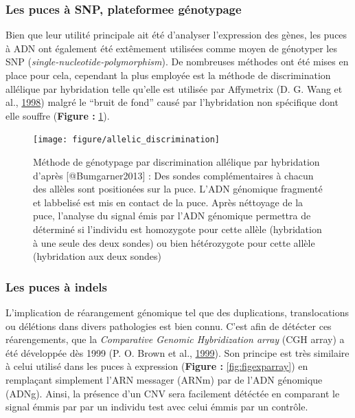 \documentclass[12pt,twoside]{reedthesis}
\theoremstyle{definition}
\theoremstyle{definition}
\theoremstyle{remark}
\begin{document}
  \newpage
  
  \subsubsection{Les puces à SNP, plateformee
  génotypage}\label{les-puces-a-snp-plateformee-genotypage}
  
  Bien que leur utilité principale ait été d'analyser l'expression des
  gènes, les puces à ADN ont également été extêmement utilisées comme
  moyen de génotyper les SNP (\emph{single-nucleotide-polymorphism}). De
  nombreuses méthodes ont été mises en place pour cela, cependant la plus
  employée est la méthode de discrimination allélique par hybridation
  telle qu'elle est utilisée par Affymetrix (D. G. Wang et al.,
  \protect\hyperlink{ref-Wang1998}{1998}) malgré le ``bruit de fond''
  causé par l'hybridation non spécifique dont elle souffre (\textbf{Figure
  :} \ref{fig:figallelicdisc}).
  
  \begin{figure}
  
  {\centering \texttt{[image: figure/allelic\_discrimination]} 
  
  }
  
  \caption[Méthode de génotypage par discrimination allélique par hybridation]{Méthode de génotypage par discrimination allélique par hybridation d'après [@Bumgarner2013] : Des sondes complémentaires à chacun des allèles sont positionées sur la puce. L'ADN génomique fragmenté et labbelisé est mis en contact de la puce. Après néttoyage de la puce, l'analyse du signal émis par l'ADN génomique permettra de déterminé si l'individu est homozygote pour cette allèle (hybridation à une seule des deux sondes) ou bien hétérozygote pour cette allèle (hybridation aux deux sondes)}\label{fig:figallelicdisc}
  \end{figure}
  
  \newpage
  
  \subsubsection{Les puces à indels}\label{les-puces-a-indels}
  
  L'implication de réarangement génomique tel que des duplications,
  translocations ou délétions dans divers pathologies est bien connu.
  C'est afin de détécter ces réarengements, que la \emph{Comparative
  Genomic Hybridization array} (CGH array) a été développée dès 1999 (P.
  O. Brown et al., \protect\hyperlink{ref-Brown1999}{1999}). Son principe
  est très similaire à celui utilisé dans les puces à expression
  (\textbf{Figure :} \ref{fig:figexparray}) en remplaçant simplement l'ARN
  messager (ARNm) par de l'ADN génomique (ADNg). Ainsi, la présence d'un
  CNV sera facilement détéctée en comparant le signal émmis par par un
  individu test avec celui émmis par un contrôle.
  
\end{document}

